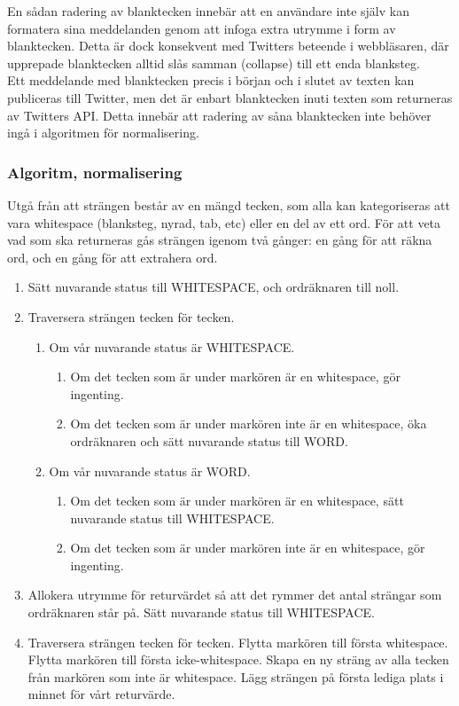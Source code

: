 \documentclass[a4paper,11pt]{article}
\begin{document}
En sådan radering av blanktecken innebär att en användare inte själv kan formatera sina meddelanden genom att infoga extra utrymme i form av blanktecken. Detta är dock konsekvent med Twitters beteende i webbläsaren, där upprepade blanktecken alltid slås samman (collapse) till ett enda blanksteg. \\

Ett meddelande med blanktecken precis i början och i slutet av texten kan publiceras till Twitter, men det är enbart blanktecken inuti texten som returneras av Twitters API. Detta innebär att radering av såna blanktecken inte behöver ingå i algoritmen för normalisering.

\subsubsection{Algoritm, normalisering}
Utgå från att strängen består av en mängd tecken, som alla kan kategoriseras att vara whitespace (blanksteg, nyrad, tab, etc) eller en del av ett ord. För att veta vad som ska returneras gås strängen igenom två gånger: en gång för att räkna ord, och en gång för att extrahera ord.
	\begin{enumerate}
    	\item Sätt nuvarande status till WHITESPACE, och ordräknaren till noll.
    	\item Traversera strängen tecken för tecken.
    		\begin{enumerate}
        	\item Om vår nuvarande status är WHITESPACE.
        		\begin{enumerate}
            		\item Om det tecken som är under markören är en whitespace, gör ingenting.
            		\item Om det tecken som är under markören inte är en whitespace, öka ordräknaren och sätt nuvarande status till WORD.
            		\end{enumerate}
        	\item Om vår nuvarande status är WORD.
        		\begin{enumerate}
            		\item Om det tecken som är under markören är en whitespace, sätt nuvarande status till WHITESPACE.
            		\item Om det tecken som är under markören inte är en whitespace, gör ingenting.
            		\end{enumerate}
            	\end{enumerate}
    	\item Allokera utrymme för returvärdet så att det rymmer det antal strängar som ordräknaren står på. Sätt nuvarande status till WHITESPACE.
    	\item Traversera strängen tecken för tecken.
        Flytta markören till första whitespace.
        Flytta markören till första icke-whitespace.
        Skapa en ny sträng av alla tecken från markören som inte är whitespace. Lägg strängen på första lediga plats i minnet för vårt returvärde.
	\end{enumerate}
	
\end{document}
